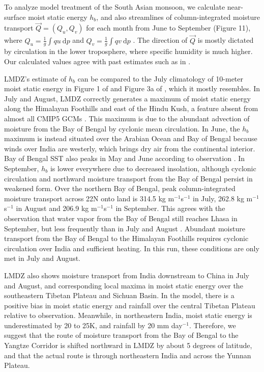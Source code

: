 	To analyze model treatment of the South Asian monsoon, we calculate near-surface moist static energy $h_b$, and also streamlines of column-integrated moisture transport $\vec{Q}=(Q_u,Q_v)$ for each month from June to September (Figure 11), where $Q_u=\frac{1}{g}\int qu\ \mathrm{d}p$ and $Q_v= \frac{1}{g}\int qv\ \mathrm{d}p$ \citep{Trenberth1991}. The direction of $\vec{Q}$ is mostly dictated by circulation in the lower troposphere, where specific humidity is much higher. Our calculated values agree with past estimates such as in \cite{Feng2012}. 
	
	LMDZ's estimate of $h_b$ can be compared to the July climatology of 10-meter moist static energy in Figure 1 of \cite{Nie2010} and Figure 3a of \cite{Boos2013a}, which it mostly resembles. In July and August, LMDZ correctly generates a maximum of moist static energy along the Himalayan Foothills and east of the Hindu Kush, a feature absent from almost all CMIP5 GCMs \citep{Boos2013a}. This maximum is due to the abundant advection of moisture from the Bay of Bengal by cyclonic mean circulation. In June, the $h_b$ maximum is instead situated over the Arabian Ocean and Bay of Bengal because winds over India are westerly, which brings dry air from the continental interior. Bay of Bengal SST also peaks in May and June according to observation \citep{Bhat2004}. In September, $h_b$ is lower everywhere due to decreased insolation, although cyclonic circulation and northward moisture transport from the Bay of Bengal persist in weakened form. Over the northern Bay of Bengal, peak column-integrated moisture transport across 22\textdegree N onto land is 314.5 kg m$^{-1}$s$^{-1}$ in July, 262.8 kg m$^{-1}$s$^{-1}$ in August and 206.9 kg m$^{-1}$s$^{-1}$ in September. This agrees with the observation that water vapor from the Bay of Bengal still reaches Lhasa in September, but less frequently than in July and August \citep{Gao2011}. Abundant moisture transport from the Bay of Bengal to the Himalayan Foothills requires cyclonic circulation over India and sufficient heating. In this run, these conditions are only met in July and August.
	
	LMDZ also shows moisture transport from India downstream to China in July and August, and corresponding local maxima in moist static energy over the southeastern Tibetan Plateau and Sichuan Basin. In the model, there is a positive bias in moist static energy and rainfall over the central Tibetan Plateau relative to observation. Meanwhile, in northeastern India, moist static energy is underestimated by 20 to 25K, and rainfall by 20 mm day$^{-1}$. Therefore, we suggest that the route of moisture transport from the Bay of Bengal to the Yangtze Corridor is shifted northward in LMDZ by about 5 degrees of latitude, and that the actual route is through northeastern India and across the Yunnan Plateau.

